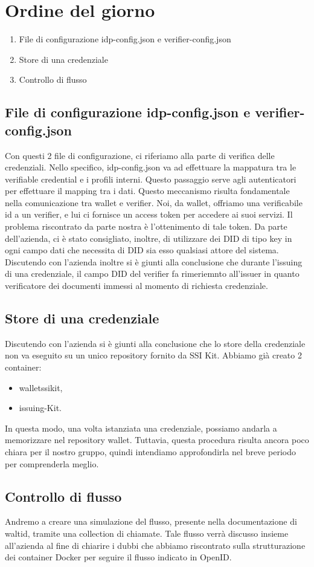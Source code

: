 \section{Ordine del giorno}
\begin{enumerate}
\item File di configurazione idp-config.json e verifier-config.json 
\item Store di una credenziale
\item Controllo di flusso
\end{enumerate}

\subsection{File di configurazione idp-config.json e verifier-config.json} 
Con questi 2 file di configurazione, ci riferiamo alla parte di verifica delle credenziali. Nello specifico, idp-config.json va ad effettuare la mappatura tra le verifiable credential e i profili interni. Questo passaggio serve agli autenticatori per effettuare il mapping tra i dati. 
Questo meccanismo risulta fondamentale nella comunicazione tra wallet e verifier. Noi, da wallet, offriamo una verificabile id a un verifier, e lui ci fornisce un access token per accedere ai suoi servizi. Il problema riscontrato da parte nostra è l'ottenimento di tale token. 
Da parte dell'azienda, ci è stato consigliato, inoltre, di utilizzare dei DID di tipo key in ogni campo dati che necessita di DID sia esso qualsiasi attore del sistema. 
Discutendo con l'azienda inoltre si è giunti alla conclusione che durante l'issuing di una credenziale, il campo DID del verifier fa rimeriemnto all'issuer in quanto verificatore dei documenti immessi al momento di richiesta credenziale.

\subsection{Store di una credenziale}
Discutendo con l'azienda si è giunti alla conclusione che lo store della credenziale non va eseguito su un unico repository fornito da SSI Kit. 
Abbiamo già creato 2 container:
\begin{itemize}
  \item walletssikit,
  \item issuing-Kit.
\end{itemize}

In questa modo, una volta istanziata una credenziale, possiamo andarla a memorizzare nel repository wallet. 
Tuttavia, questa procedura risulta ancora poco chiara per il nostro gruppo, quindi intendiamo approfondirla nel breve periodo per comprenderla meglio.
\subsection{Controllo di flusso}
Andremo a creare una simulazione del flusso, presente nella documentazione di waltid, tramite una collection di chiamate. 
Tale flusso verrà discusso insieme all'azienda al fine di chiarire i dubbi che abbiamo riscontrato sulla strutturazione dei container Docker per seguire il flusso indicato in OpenID.



